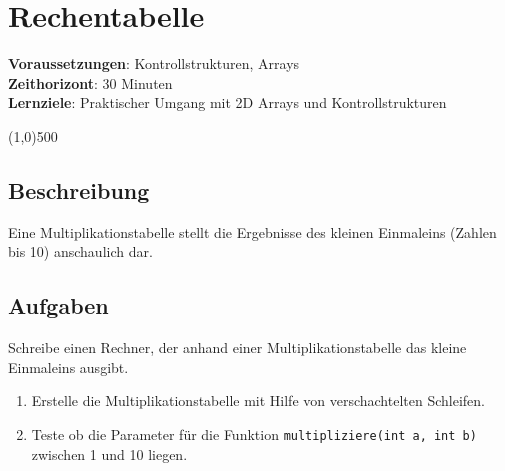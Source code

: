 

\chapter*{Rechentabelle}

\headingfont
\parbox {\textwidth}{
    \textbf{Voraussetzungen}: Kontrollstrukturen, Arrays \\
    \textbf{Zeithorizont}: 30 Minuten \\
    \textbf{Lernziele}: Praktischer Umgang mit 2D Arrays und Kontrollstrukturen
}

\normalfont
\begin{center}
\line(1,0){500}
\end{center}
\vspace{1cm}

\section*{Beschreibung}
Eine Multiplikationstabelle stellt die Ergebnisse des kleinen Einmaleins (Zahlen bis 10) anschaulich dar.

\section*{Aufgaben}
Schreibe einen Rechner, der anhand einer Multiplikationstabelle das kleine Einmaleins ausgibt.
\begin{enumerate}
     \item Erstelle die Multiplikationstabelle mit Hilfe von verschachtelten Schleifen.
     \item Teste ob die Parameter für die Funktion \texttt{multipliziere(int a, int b)} zwischen 1 und 10 liegen.
\end{enumerate}

